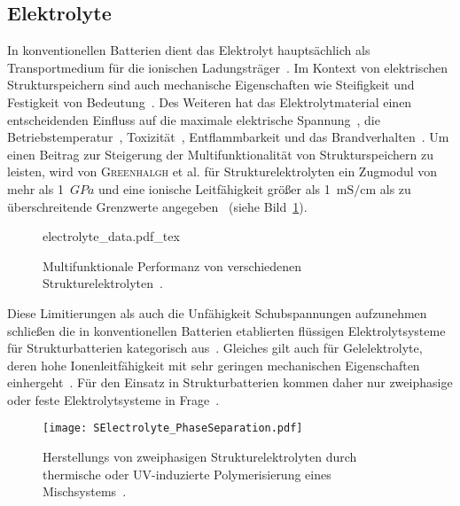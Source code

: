 \subsection{Elektrolyte}
In konventionellen Batterien dient das Elektrolyt hauptsächlich als Transportmedium für die ionischen Ladungsträger~\cite{Gerlach2020}. Im Kontext von elektrischen Strukturspeichern sind auch mechanische Eigenschaften wie Steifigkeit und Festigkeit von Bedeutung~\cite{Greenhalgh2023}. Des Weiteren hat das Elektrolytmaterial einen entscheidenden Einfluss auf die maximale elektrische Spannung~\cite{Xu2016}, die Betriebstemperatur~\cite{Chen2022a}, Toxizität~\cite{Beard2019}, Entflammbarkeit und das Brandverhalten~\cite{Roth2012}. Um einen Beitrag zur Steigerung der Multifunktionalität von Strukturspeichern zu leisten, wird von \textsc{Greenhalgh} et al. für Strukturelektrolyten ein Zugmodul von mehr als 1~$\si{GPa}$ und eine ionische Leitfähigkeit größer als 1~$\si{\milli \siemens \per \cm}$ als zu überschreitende Grenzwerte angegeben~\cite{Greenhalgh2023} (siehe Bild~\ref{fig:electrolyte_data}).
\begin{figure}[ht]
        \center
		{electrolyte_data.pdf_tex}
		\caption{\label{fig:electrolyte_data}Multifunktionale Performanz von verschiedenen Strukturelektrolyten~\cite{Greenhalgh2023}.}
\end{figure}

Diese Limitierungen als auch die Unfähigkeit Schubspannungen aufzunehmen schließen die in konventionellen Batterien etablierten flüssigen Elektrolytsysteme für Strukturbatterien kategorisch aus~\cite{Shirshova2013, Greenhalgh2023}. Gleiches gilt auch für Gelelektrolyte, deren hohe Ionenleitfähigkeit mit sehr geringen mechanischen Eigenschaften einhergeht~\cite{Gayet2009, Li2018, Zhao2020a}. Für den Einsatz in Strukturbatterien kommen daher nur zweiphasige oder feste Elektrolytsysteme in Frage~\cite{Greenhalgh2023}.

\begin{figure}[!h]
        \center
		\texttt{[image: SElectrolyte\_PhaseSeparation.pdf]}
		\caption{\label{fig:SE_PhaseSepearation}Herstellungs von zweiphasigen Strukturelektrolyten durch thermische oder UV-induzierte Polymerisierung eines Mischsystems~\cite{Schneider2019}.}
\end{figure}

